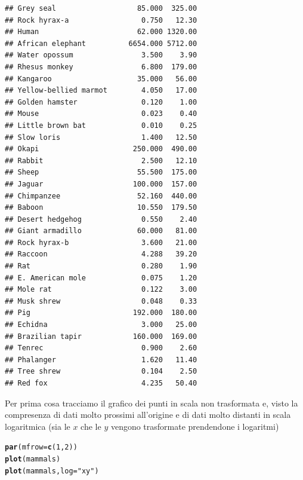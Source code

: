 \documentclass[onecolumn,12pt]{book}\usepackage[]{graphicx}\usepackage[]{color}
\makeatletter
\newcommand{\hlnum}[1]{\textcolor[rgb]{0.686,0.059,0.569}{#1}}%
\newcommand{\hlstr}[1]{\textcolor[rgb]{0.192,0.494,0.8}{#1}}%
\newcommand{\hlstd}[1]{\textcolor[rgb]{0.345,0.345,0.345}{#1}}%
\newcommand{\hlkwc}[1]{\textcolor[rgb]{0.333,0.667,0.333}{#1}}%
\newcommand{\hlkwd}[1]{\textcolor[rgb]{0.737,0.353,0.396}{\textbf{#1}}}%
\newenvironment{kframe}{%
 \def\at@end@of@kframe{}%
 \ifinner\ifhmode%
  \def\at@end@of@kframe{\end{minipage}}%
  \begin{minipage}{\columnwidth}%
 \fi\fi%
 \def\FrameCommand##1{\hskip\@totalleftmargin \hskip-\fboxsep
 \colorbox{shadecolor}{##1}\hskip-\fboxsep
     \hskip-\linewidth \hskip-\@totalleftmargin \hskip\columnwidth}%
 \MakeFramed {\advance\hsize-\width
   \@totalleftmargin\z@ \linewidth\hsize
   \@setminipage}}%
 {\par\unskip\endMakeFramed%
 \at@end@of@kframe}
\newenvironment{knitrout}{}{} %
\makeatother
\begin{document}
\begin{knitrout}
\begin{kframe}
\begin{verbatim}
## Grey seal                   85.000  325.00
## Rock hyrax-a                 0.750   12.30
## Human                       62.000 1320.00
## African elephant          6654.000 5712.00
## Water opossum                3.500    3.90
## Rhesus monkey                6.800  179.00
## Kangaroo                    35.000   56.00
## Yellow-bellied marmot        4.050   17.00
## Golden hamster               0.120    1.00
## Mouse                        0.023    0.40
## Little brown bat             0.010    0.25
## Slow loris                   1.400   12.50
## Okapi                      250.000  490.00
## Rabbit                       2.500   12.10
## Sheep                       55.500  175.00
## Jaguar                     100.000  157.00
## Chimpanzee                  52.160  440.00
## Baboon                      10.550  179.50
## Desert hedgehog              0.550    2.40
## Giant armadillo             60.000   81.00
## Rock hyrax-b                 3.600   21.00
## Raccoon                      4.288   39.20
## Rat                          0.280    1.90
## E. American mole             0.075    1.20
## Mole rat                     0.122    3.00
## Musk shrew                   0.048    0.33
## Pig                        192.000  180.00
## Echidna                      3.000   25.00
## Brazilian tapir            160.000  169.00
## Tenrec                       0.900    2.60
## Phalanger                    1.620   11.40
## Tree shrew                   0.104    2.50
## Red fox                      4.235   50.40
\end{verbatim}
\end{kframe}
\end{knitrout}
Per prima cosa tracciamo il grafico dei punti  in scala non trasformata e, visto la compresenza di dati molto prossimi all'origine e di dati molto distanti in scala logaritmica (sia le $x$ che le $y$ vengono trasformate prendendone i logaritmi)
\begin{knitrout}
\color{fgcolor}\begin{kframe}
\begin{alltt}
\hlkwd{par}\hlstd{(}\hlkwc{mfrow}\hlstd{=}\hlkwd{c}\hlstd{(}\hlnum{1}\hlstd{,}\hlnum{2}\hlstd{))}
\hlkwd{plot}\hlstd{(mammals)}
\hlkwd{plot}\hlstd{(mammals,}\hlkwc{log}\hlstd{=}\hlstr{"xy"}\hlstd{)}
\end{alltt}
\end{kframe}
\end{knitrout}
\end{document}
